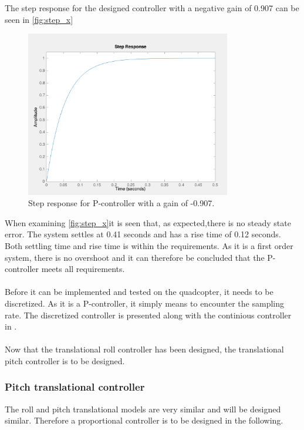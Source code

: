 The step response for the designed controller with a negative gain of 0.907 can be seen in \autoref{fig:step_x}
\begin{figure}[H]
	\centering
	\includegraphics[width=0.8\textwidth]{figures/step_x.png}
	\caption{Step response for P-controller with a gain of -0.907.}\label{fig:step_x}
\end{figure}
When examining \autoref{fig:step_x}it is seen that, as expected,there is no steady state error. The system settles at 0.41 seconds and has a rise time of 0.12 seconds. Both settling time and rise time is within the requirements. As it is a first order system, there is no overshoot and it can therefore be concluded that the P-controller meets all requirements.
\\
\\
Before it can be implemented and tested on the quadcopter, it needs to be discretized. As it is a P-controller, it simply means to encounter the sampling rate. The discretized controller is presented along with the continious controller in .
\\ \\
Now that the translational roll controller has been designed, the translational pitch controller is to be designed.  
\subsubsection*{Pitch translational controller}
The roll and pitch translational models are very similar and will be designed similar. Therefore a proportional controller is to be designed in the following.\\

